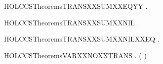 \newcommand{\HOLCCSTheoremsTRANSXXSUMXXEQ}{\UseVerbatim{HOLCCSTheoremsTRANSXXSUMXXEQ}}
\begin{SaveVerbatim}{HOLCCSTheoremsTRANSXXSUMXXEQYY}
\HOLTokenTurnstile{} \HOLSymConst{\HOLTokenForall{}}   .  \HOLSymConst{\ensuremath{+}}  \HOLTokenTransBegin{}\HOLTokenTransEnd {} \HOLSymConst{\HOLTokenEquiv{}}  \HOLTokenTransBegin{}\HOLTokenTransEnd {} \HOLSymConst{\HOLTokenDisj{}}  \HOLTokenTransBegin{}\HOLTokenTransEnd {}
\end{SaveVerbatim}
\newcommand{\HOLCCSTheoremsTRANSXXSUMXXEQYY}{\UseVerbatim{HOLCCSTheoremsTRANSXXSUMXXEQYY}}
\begin{SaveVerbatim}{HOLCCSTheoremsTRANSXXSUMXXNIL}
\HOLTokenTurnstile{} \HOLSymConst{\HOLTokenForall{}}  .  \HOLSymConst{\ensuremath{+}}  \HOLTokenTransBegin{}\HOLTokenTransEnd {} \HOLSymConst{\HOLTokenImp{}}  \HOLTokenTransBegin{}\HOLTokenTransEnd {}
\end{SaveVerbatim}
\newcommand{\HOLCCSTheoremsTRANSXXSUMXXNIL}{\UseVerbatim{HOLCCSTheoremsTRANSXXSUMXXNIL}}
\begin{SaveVerbatim}{HOLCCSTheoremsTRANSXXSUMXXNILXXEQ}
\HOLTokenTurnstile{} \HOLSymConst{\HOLTokenForall{}}  .  \HOLSymConst{\ensuremath{+}}  \HOLTokenTransBegin{}\HOLTokenTransEnd {} \HOLSymConst{\HOLTokenEquiv{}}  \HOLTokenTransBegin{}\HOLTokenTransEnd {}
\end{SaveVerbatim}
\newcommand{\HOLCCSTheoremsTRANSXXSUMXXNILXXEQ}{\UseVerbatim{HOLCCSTheoremsTRANSXXSUMXXNILXXEQ}}
\begin{SaveVerbatim}{HOLCCSTheoremsVARXXNOXXTRANS}
\HOLTokenTurnstile{} \HOLSymConst{\HOLTokenForall{}}  . \HOLSymConst{\HOLTokenNeg{}}(  \HOLTokenTransBegin{}\HOLTokenTransEnd {})
\end{SaveVerbatim}
\newcommand{\HOLCCSTheoremsVARXXNOXXTRANS}{\UseVerbatim{HOLCCSTheoremsVARXXNOXXTRANS}}
